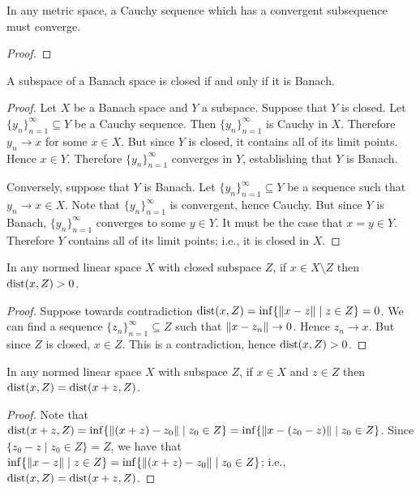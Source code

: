 \begin{exercise}
In any metric space, a Cauchy sequence which has a convergent subsequence must converge.
\end{exercise}
    {\color{red} \begin{proof}
        
    \end{proof}}

\begin{exercise}\label{exercise:ch1-subspace-closed-iff-banach}
A subspace of a Banach space is closed if and only if it is Banach.
\end{exercise}
    \begin{proof}
        Let $X$ be a Banach space and $Y$ a subspace. Suppose that $Y$ is closed. Let $\{y_n\}_{n = 1}^\infty \subseteq Y$ be a Cauchy sequence. Then $\{y_n\}_{n = 1}^\infty$ is Cauchy in $X$. Therefore $y_n \rightarrow x$ for some $x \in X$. But since $Y$ is closed, it contains all of its limit points. Hence $x \in Y$. Therefore $\{y_n\}_{n = 1}^\infty$ converges in $Y$, establishing that $Y$ is Banach.

        Conversely, suppose that $Y$ is Banach. Let $\{y_n\}_{n = 1}^\infty \subseteq Y$ be a sequence such that $y_n \rightarrow x \in X$. Note that $\{y_n\}_{n = 1}^\infty$ is convergent, hence Cauchy. But since $Y$ is Banach, $\{y_n\}_{n = 1}^\infty$ converges to some $y \in Y$. It must be the case that $x = y \in Y$. Therefore $Y$ contains all of its limit points; i.e., it is closed in $X$.
    \end{proof}

\begin{exercise}
In any normed linear space $X$ with closed subspace $Z$, if $x \in X \setminus Z$ then $\operatorname{dist}(x,Z) > 0$.
\end{exercise}
    \begin{proof}
        Suppose towards contradiction $\operatorname{dist}(x,Z) = \inf\{\left\lVert x-z \right\rVert \mid z \in Z\} = 0$. We can find a sequence $\{z_n\}_{n = 1}^\infty \subseteq Z$ such that $\left\lVert x - z_n \right\rVert \rightarrow 0$. Hence $z_n \rightarrow x$. But since $Z$ is closed, $x \in Z$. This is a contradiction, hence $\operatorname{dist}(x,Z) > 0$.
    \end{proof}

\begin{exercise}
In any normed linear space $X$ with subspace $Z$, if $x \in X$ and $z \in Z$ then $\operatorname{dist}(x,Z) = \operatorname{dist}(x+z,Z)$.
\end{exercise}
    \begin{proof}
        Note that $\operatorname{dist}(x+z,Z) = \inf\{ \left\lVert (x+z) - z_0 \right\rVert \mid z_0 \in Z\} = \inf\{\left\lVert x - (z_0 - z) \right\rVert \mid z_0 \in Z\}$. Since $\{z_0 - z \mid z_0 \in Z\} = Z$, we have that $\inf\{ \left\lVert x - z \right\rVert \mid z \in Z\} = \inf\{ \left\lVert (x+z) - z_0 \right\rVert \mid z_0 \in Z\}$; i.e., $\operatorname{dist}(x,Z) = \operatorname{dist}(x+z,Z)$.
    \end{proof}

